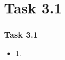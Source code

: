 \section{Task 3.1}
\begin{frame}
\frametitle{Task 3.1}
\begin{itemize}
\item 1. 
\end{itemize}
\end{frame}